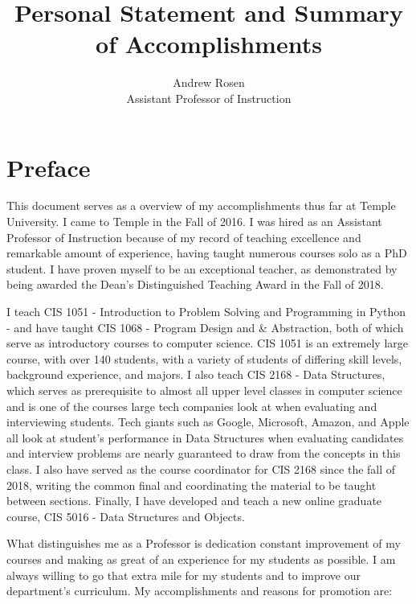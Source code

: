 \documentclass[10pt]{article}
\title{Personal Statement and Summary of Accomplishments}
\author{Andrew Rosen\\Assistant Professor of Instruction}
\date{}
\begin{document}
\maketitle


\section{Preface}
This document serves as a overview of my accomplishments thus far at Temple University.  
I came to Temple in the Fall of 2016.
I was hired as an Assistant Professor of Instruction because of my record of teaching excellence and remarkable amount of experience, having taught numerous courses solo as a PhD student.
I have proven myself to be an exceptional teacher, as demonstrated by being awarded the Dean's Distinguished Teaching Award in the Fall of 2018.

I teach CIS 1051 -  Introduction to Problem Solving and Programming in Python - and have taught CIS 1068 -  Program Design and \& Abstraction, both of which serve as introductory courses to computer science.
CIS 1051 is an extremely large course, with over 140 students, with a variety of students of differing skill levels, background experience, and majors.
I also teach CIS 2168 - Data Structures,  which serves as prerequisite to almost all upper level classes in computer science and is one of the courses large tech companies look at when evaluating and interviewing students.
Tech giants such as Google, Microsoft, Amazon, and Apple all look at student's performance in Data Structures when evaluating candidates and  interview problems are nearly guaranteed to draw from the concepts in this class.  
I also have served as the course coordinator for CIS 2168 since the fall of 2018, writing the common final and coordinating the material to be taught between sections.
Finally, I have developed and teach a new online graduate course, CIS 5016 - Data Structures and Objects.

What distinguishes me as a Professor is dedication constant improvement of my courses and making as great of an experience for my students as possible.
I am always willing to go that extra mile for my students and to improve our department's curriculum.
My accomplishments and reasons for promotion are:
\end{document}
